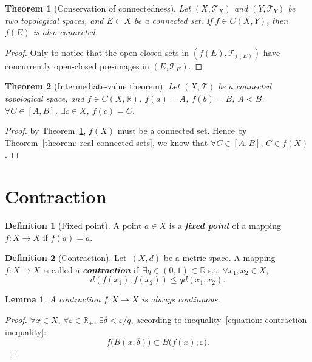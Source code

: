 \documentclass[openany]{book}
\newcommand*{\indexbf}[1]{\emph{\textbf{#1}}\index{#1}} %
\theoremstyle{plain}
\newtheorem{theorem}{Theorem}[section] %
\newtheorem{lemma}{Lemma} %
\theoremstyle{definition}
\newtheorem{definition}{Definition}[section] %
\begin{document}
\begin{theorem}[Conservation of connectedness]\label{theorem: conservation of connectedness}
	Let $(X, \mathscr T_X)$ and $(Y, \mathscr T_Y)$ be two topological spaces, and $E \subset X$ be a connected set. 
	If $f \in C(X, Y)$, then $f(E)$ is also connected.
\end{theorem}
\begin{proof}
	Only to notice that the open-closed sets in $(f(E), \mathscr T_{ f(E)})$ have concurrently open-closed pre-images in $(E, \mathscr T_E)$.
\end{proof}

\begin{theorem}[Intermediate-value theorem]
	\label{theorem: intermediate-value}
	Let $(X, \mathscr T)$ be a connected topological space, and $f \in C(X, \mathbb R)$, $f(a) = A$, $f(b) = B$, $A < B$.
	$\forall C \in [A, B]$, $\exists c \in X$, $f(c) = C$.
\end{theorem}
\begin{proof}
	by Theorem~\ref{theorem: conservation of connectedness}, $f(X)$ must be a connected set. Hence by Theorem~\ref{theorem: real connected sets}, we know that $\forall C \in [A, B]$, $C \in f(X)$.
\end{proof}

\section{Contraction}

\begin{definition}[Fixed point]\label{definition: fixed_point}
	A point $a\in X$ is a \indexbf{fixed point} of a mapping $f \colon X \to X$ if $f( a) = a$.
\end{definition}

\begin{definition}[Contraction]\label{definition: contraction}
	Let~$(X, d)$ be a metric space. 
	A mapping~$f \colon X \to X$ is called a \indexbf{contraction} if~$\exists q \in (0, 1) \subset \mathbb R$ s.t. $\forall x_1,x_2 \in X$, 
	\begin{equation}\label{equation: contraction inequality}
		d(f(x_1), f (x_2)) \leq q d(x_1, x_2).
	\end{equation}
\end{definition}

\begin{lemma}\label{lemma: contraction is continuous}
	A contraction $f \colon X \to X$ is always continuous.
\end{lemma}
\begin{proof}
	$\forall x \in X$, $\forall \varepsilon \in \mathbb R_+ $, $\exists \delta < \varepsilon / q$, according to inequality~\ref{equation: contraction inequality}:
	\[
	f\big( B(x; \delta ) \big) 
	\subset 
	B\big( f(x); \varepsilon \big).
	\]
\end{proof}
\end{document}
